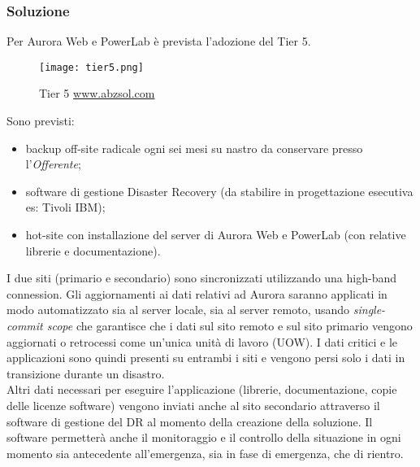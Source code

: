 \subsubsection{Soluzione}
Per Aurora Web e PowerLab è prevista l'adozione del Tier 5.
\begin{figure}[H]
\centering
\texttt{[image: tier5.png]}
\caption{Tier 5 \href{https://www.abzsol.com/cms/images/stories/pdf/business_continuity.pdf}{www.abzsol.com}}
\end{figure}
Sono previsti:
\begin{itemize}
\item backup off-site radicale ogni sei mesi su nastro da conservare presso l'\textit{Offerente};
\item software di gestione Disaster Recovery (da stabilire in progettazione esecutiva es: Tivoli IBM);
\item hot-site con installazione del server di Aurora Web e PowerLab (con relative librerie e documentazione).
\end{itemize}
I due siti (primario e secondario) sono sincronizzati utilizzando una high-band connession. Gli aggiornamenti ai dati relativi ad Aurora saranno applicati in modo automatizzato sia al server locale, sia al server remoto, usando \textit{single-commit scope} che garantisce che i dati sul sito remoto e sul sito primario vengono aggiornati o retrocessi come un'unica unità di lavoro (UOW). I dati critici e le applicazioni sono quindi presenti su entrambi i siti e vengono persi solo i dati in transizione durante un disastro.\\
Altri dati necessari per eseguire l'applicazione (librerie, documentazione, copie delle licenze software) vengono inviati anche al sito secondario attraverso il software di gestione del DR al momento della creazione della soluzione. Il software permetterà anche il monitoraggio e il controllo della situazione in ogni momento sia antecedente all'emergenza, sia in fase di emergenza, che di rientro.

